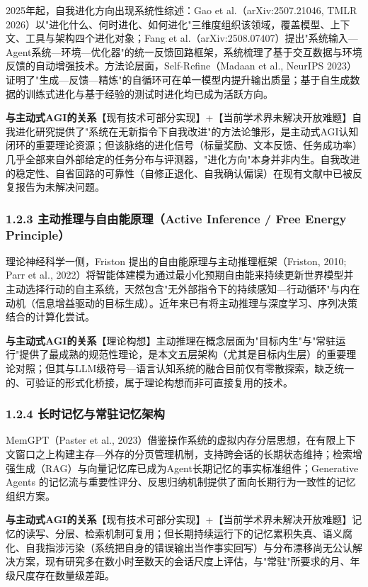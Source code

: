 \documentclass[11pt,a4paper]{ctexart}
\begin{document}
2025年起，自我进化方向出现系统性综述：Gao et al.（arXiv:2507.21046, TMLR 2026）以"进化什么、何时进化、如何进化"三维度组织该领域，覆盖模型、上下文、工具与架构四个进化对象；Fang et al.（arXiv:2508.07407）提出"系统输入—Agent系统—环境—优化器"的统一反馈回路框架，系统梳理了基于交互数据与环境反馈的自动增强技术。方法论层面，Self-Refine（Madaan et al., NeurIPS 2023）证明了"生成—反馈—精炼"的自循环可在单一模型内提升输出质量；基于自生成数据的训练式进化与基于经验的测试时进化均已成为活跃方向。

\textbf{与主动式AGI的关系}【现有技术可部分实现】+【当前学术界未解决开放难题】自我进化研究提供了"系统在无新指令下自我改进"的方法论雏形，是主动式AGI认知闭环的重要理论资源；但该脉络的进化信号（标量奖励、文本反馈、任务成功率）几乎全部来自外部给定的任务分布与评测器，"进化方向"本身并非内生。自我改进的稳定性、自省回路的可靠性（自修正退化、自我确认偏误）在现有文献中已被反复报告为未解决问题。

\subsubsection{1.2.3 主动推理与自由能原理（Active Inference / Free Energy Principle）}

理论神经科学一侧，Friston 提出的自由能原理与主动推理框架（Friston, 2010; Parr et al., 2022）将智能体建模为通过最小化预期自由能来持续更新世界模型并主动选择行动的自主系统，天然包含"无外部指令下的持续感知—行动循环"与内在动机（信息增益驱动的目标生成）。近年来已有将主动推理与深度学习、序列决策结合的计算化尝试。

\textbf{与主动式AGI的关系}【理论构想】主动推理在概念层面为"目标内生"与"常驻运行"提供了最成熟的规范性理论，是本文五层架构（尤其是目标内生层）的重要理论对照；但其与LLM级符号—语言认知系统的融合目前仅有零散探索，缺乏统一的、可验证的形式化桥接，属于理论构想而非可直接复用的技术。

\subsubsection{1.2.4 长时记忆与常驻记忆架构}

MemGPT（Paster et al., 2023）借鉴操作系统的虚拟内存分层思想，在有限上下文窗口之上构建主存—外存的分页管理机制，支持跨会话的长期状态维持；检索增强生成（RAG）与向量记忆库已成为Agent长期记忆的事实标准组件；Generative Agents 的记忆流与重要性评分、反思归纳机制提供了面向长期行为一致性的记忆组织方案。

\textbf{与主动式AGI的关系}【现有技术可部分实现】+【当前学术界未解决开放难题】记忆的读写、分层、检索机制可复用；但长期持续运行下的记忆累积失真、语义腐化、自我指涉污染（系统把自身的错误输出当作事实回写）与分布漂移尚无公认解决方案，现有研究多在数小时至数天的会话尺度上评估，与"常驻"所要求的月、年级尺度存在数量级差距。
\end{document}
